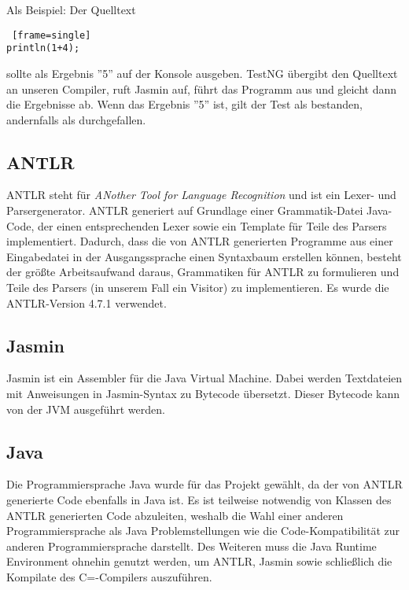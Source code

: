 Als Beispiel: Der Quelltext
\begin{lstlisting} [frame=single]
println(1+4);
\end{lstlisting}

sollte als Ergebnis ''5'' auf der Konsole ausgeben. TestNG übergibt den Quelltext an unseren Compiler, ruft Jasmin auf, führt das Programm aus und gleicht dann die Ergebnisse ab. Wenn das Ergebnis ''5'' ist, gilt der Test als bestanden, andernfalls als durchgefallen. 

\subsection{ANTLR}
ANTLR steht für \textit{ANother Tool for Language Recognition} und ist ein Lexer- und Parsergenerator. ANTLR generiert auf Grundlage einer Grammatik-Datei Java-Code, der einen entsprechenden Lexer sowie ein Template für Teile des Parsers implementiert. Dadurch, dass die von ANTLR generierten Programme aus einer Eingabedatei in der Ausgangssprache einen Syntaxbaum erstellen können, besteht der größte Arbeitsaufwand daraus, Grammatiken für ANTLR zu formulieren und Teile des Parsers (in unserem Fall ein Visitor) zu implementieren. Es wurde die ANTLR-Version 4.7.1 verwendet.

\subsection{Jasmin}
Jasmin ist ein Assembler für die Java Virtual Machine. Dabei werden Textdateien mit Anweisungen in Jasmin-Syntax zu Bytecode übersetzt. Dieser Bytecode kann von der JVM ausgeführt werden.

\subsection{Java}
Die Programmiersprache Java wurde für das Projekt gewählt, da der von ANTLR generierte Code ebenfalls in Java ist. Es ist teilweise notwendig von Klassen des ANTLR generierten Code abzuleiten, weshalb die Wahl einer anderen Programmiersprache als Java Problemstellungen wie die Code-Kompatibilität zur anderen Programmiersprache darstellt. 
Des Weiteren muss die Java Runtime Environment ohnehin genutzt werden, um ANTLR, Jasmin sowie schließlich die Kompilate des C=-Compilers auszuführen.

